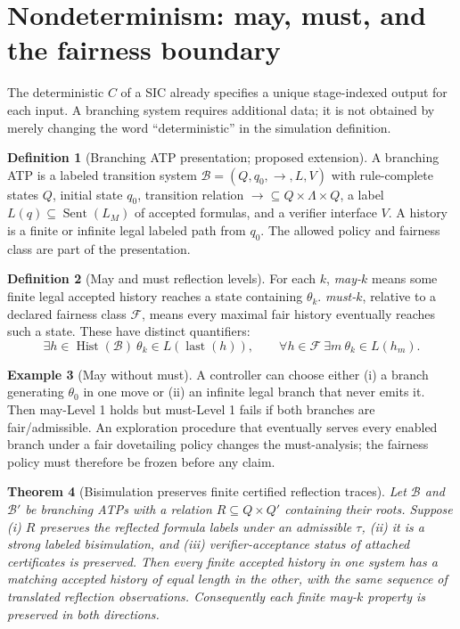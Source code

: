 \documentclass[11pt,letterpaper]{article}
\newtheorem{theorem}{Theorem}[section]
\theoremstyle{definition}\newtheorem{definition}[theorem]{Definition}\newtheorem{example}[theorem]{Example}\newtheorem{protocol}[theorem]{Protocol}\newtheorem{question}[theorem]{Open Problem}
\theoremstyle{remark}\newtheorem{remark}[theorem]{Remark}
\newcommand{\Sent}{\operatorname{Sent}}
\newcommand{\Hist}{\operatorname{Hist}}
\begin{document}
\section{Nondeterminism: may, must, and the fairness boundary}
The deterministic $C$ of a SIC already specifies a unique stage-indexed output for each input. A branching system requires additional data; it is not obtained by merely changing the word ``deterministic'' in the simulation definition.
\begin{definition}[Branching ATP presentation; proposed extension]
A branching ATP is a labeled transition system $\mathcal B=(Q,q_0,\longrightarrow,L,V)$ with rule-complete states $Q$, initial state $q_0$, transition relation $\longrightarrow\subseteq Q\times\Lambda\times Q$, a label $L(q)\subseteq\Sent(L_M)$ of accepted formulas, and a verifier interface $V$. A history is a finite or infinite legal labeled path from $q_0$. The allowed policy and fairness class are part of the presentation.
\end{definition}
\begin{definition}[May and must reflection levels]
For each $k$, \emph{may-$k$} means some finite legal accepted history reaches a state containing $\theta_k$. \emph{must-$k$}, relative to a declared fairness class $\mathcal F$, means every maximal fair history eventually reaches such a state. These have distinct quantifiers:
\[
\exists h\in\Hist(\mathcal B)\ \theta_k\in L(\operatorname{last}(h)),\qquad
\forall h\in\mathcal F\ \exists m\ \theta_k\in L(h_m).
\]
\end{definition}
\begin{example}[May without must]
A controller can choose either (i) a branch generating $\theta_0$ in one move or (ii) an infinite legal branch that never emits it. Then may-Level 1 holds but must-Level 1 fails if both branches are fair/admissible. An exploration procedure that eventually serves every enabled branch under a fair dovetailing policy changes the must-analysis; the fairness policy must therefore be frozen before any claim.
\end{example}
\begin{theorem}[Bisimulation preserves finite certified reflection traces]\label{thm:bisim}
Let $\mathcal B$ and $\mathcal B'$ be branching ATPs with a relation $R\subseteq Q\times Q'$ containing their roots. Suppose (i) $R$ preserves the reflected formula labels under an admissible $\tau$, (ii) it is a strong labeled bisimulation, and (iii) verifier-acceptance status of attached certificates is preserved. Then every finite accepted history in one system has a matching accepted history of equal length in the other, with the same sequence of translated reflection observations. Consequently each finite may-$k$ property is preserved in both directions.
\end{theorem}
\end{document}
